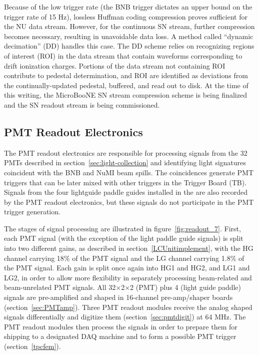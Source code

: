 Because of the low trigger rate (the BNB trigger dictates an upper bound on the trigger rate of 15 Hz), lossless Huffman coding compression proves sufficient for the NU data stream. However, for the continuous SN stream, further compression becomes necessary, resulting in unavoidable data loss. A method called ``dynamic decimation'' (DD) handles this case. The DD scheme relies on recognizing regions of interest (ROI) in the data stream that contain waveforms corresponding to drift ionization charges. Portions of the data stream not containing ROI contribute to pedestal determination, and ROI are identified as deviations from the continually-updated pedestal, buffered, and read out to disk. At the time of this writing, the MicroBooNE SN stream compression scheme is being finalized and the SN readout stream is being commissioned.

\subsection{PMT Readout Electronics}

The PMT readout electronics are responsible for processing signals from the 32 PMTs described in section~\ref{sec:light-collection} and identifying light signatures coincident with the BNB and NuMI beam spills. The coincidences generate PMT triggers that can be later mixed with other triggers in the Trigger Board (TB). Signals from the four lightguide paddle guides installed in the \lartpc are also recorded by the PMT readout electronics, but these signals do not participate in the PMT trigger generation. 

The stages of signal processing are illustrated in figure~\ref{fig:readout_7}. First, each PMT signal (with the exception of the light paddle guide signals) is split into two different gains, as described in section~\ref{LCUnitimplement}, with the HG channel carrying 18$\%$ of the PMT signal and the LG channel carrying 1.8$\%$ of the PMT signal. Each gain is split once again into HG1 and HG2, and LG1 and LG2, in order to allow more flexibility in separately processing beam-related and beam-unrelated PMT signals. All 32$\times$2$\times$2 (PMT) plus 4 (light guide paddle) signals are pre-amplified and shaped in 16-channel pre-amp/shaper boards (section~\ref{sec:PMTamp}). Three PMT readout modules receive the analog shaped signals differentially and digitize them (section~\ref{sec:pmtdigit}) at 64 MHz. The PMT readout modules then process the signals in order to prepare them for shipping to a designated DAQ machine and to form a possible PMT trigger (section~\ref{tpcfem}). 

